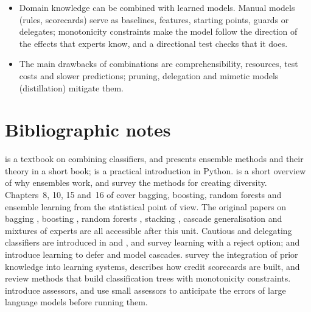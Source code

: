 \begin{itemize}
  \item Domain knowledge can be combined with learned models. Manual models (rules,
scorecards) serve as baselines, features, starting points, guards or delegates;
monotonicity constraints make the model follow the direction of the effects that
experts know, and a directional test checks that it does.
\item The main drawbacks of combinations are comprehensibility, resources, test costs and slower
        predictions; pruning, delegation and mimetic models (distillation) mitigate them.
\end{itemize}

\section*{Bibliographic notes}

\citet{kuncheva2014combining} is a textbook on combining classifiers, and
\citet{zhou2012ensemble} presents ensemble methods and their theory in a short book;
\citet{kyriakides2019hands} is a practical introduction in Python. \citet{dietterich2000ensemble}
is a short overview of why ensembles work, and \citet{brown2005diversity} survey the
methods for creating diversity. Chapters~8, 10, 15 and~16 of \citet{hastie2009elements} cover
bagging, boosting, random forests and ensemble learning from the statistical point of view. The
original papers on bagging \citep{breiman1996bagging}, boosting \citep{freund1997decision}, random
forests \citep{breiman2001random}, stacking \citep{wolpert1992stacked}, cascade generalisation
\citep{gama2000cascade} and mixtures of experts \citep{jacobs1991adaptive} are all accessible after this unit.
Cautious and delegating classifiers are introduced in \citet{ferri2004cautious} and
\citet{ferri2004delegating}, and \citet{hendrickx2024machine} survey learning with a reject option;
\citet{mozannar2020consistent} and \citet{chen2023frugalgpt} introduce learning to defer
and model cascades.
 survey the integration of prior knowledge into learning systems,
\citet{siddiqi2006credit} describes how credit scorecards are built, and
\citet{potharst2002classification} review methods that build classification trees with
monotonicity constraints.
 introduce assessors, and \citet{zhou2022reject} use
small assessors to anticipate the errors of large language models before running them.

